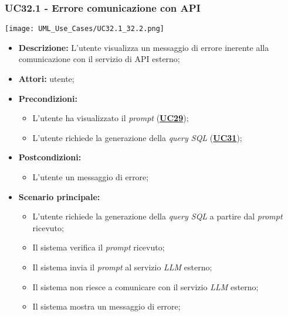 \subsubsection{UC32.1 - Errore comunicazione con API}
\label{sec:UC32.1}
\texttt{[image: UML\_Use\_Cases/UC32.1\_32.2.png]}
\begin{itemize}
	\item \textbf{Descrizione:} L'utente visualizza un messaggio di errore inerente alla comunicazione con il servizio di API esterno;
	\item \textbf{Attori:} utente;
	\item \textbf{Precondizioni:} 
	\begin{itemize}
		\item L'utente ha visualizzato il \textit{prompt} (\hyperref[sec:UC29]{\textbf{UC29}});
		\item L'utente richiede la generazione della \textit{query SQL} (\hyperref[sec:UC31]{\textbf{UC31}});
	\end{itemize}
	\item \textbf{Postcondizioni:} 
	\begin{itemize}
		\item L'utente un messaggio di errore;
	\end{itemize}
	\item \textbf{Scenario principale:}
	\begin{itemize}
		\item L'utente richiede la generazione della \textit{query SQL} a partire dal \textit{prompt} ricevuto;
		\item Il sistema verifica il \textit{prompt} ricevuto;
		\item Il sistema invia il \textit{prompt} al servizio \textit{LLM} esterno;
		\item Il sistema non riesce a comunicare con il servizio \textit{LLM} esterno;
		\item Il sistema mostra un messaggio di errore;
	\end{itemize}
\end{itemize}

